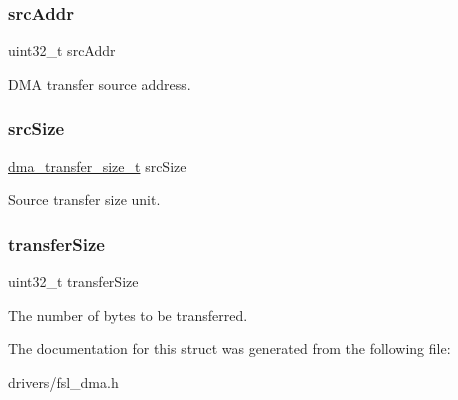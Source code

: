 \subsubsection{\texorpdfstring{srcAddr}{srcAddr}}
{\footnotesize\ttfamily uint32\+\_\+t src\+Addr}

D\+MA transfer source address. \mbox{\label{struct__dma__transfer__config_a60bfcc72290b71d1cdda387f1a7c2dac}} 
\subsubsection{\texorpdfstring{srcSize}{srcSize}}
{\footnotesize\ttfamily \mbox{\hyperlink{group__dma_ga77280b3fae0e8ee447666e14c101dfe0}{dma\+\_\+transfer\+\_\+size\+\_\+t}} src\+Size}

Source transfer size unit. \mbox{\label{struct__dma__transfer__config_a6feb07da81f2cb170eabc3d00565d404}} 
\subsubsection{\texorpdfstring{transferSize}{transferSize}}
{\footnotesize\ttfamily uint32\+\_\+t transfer\+Size}

The number of bytes to be transferred. 

The documentation for this struct was generated from the following file\+:\begin{DoxyCompactItemize}
\item 
drivers/fsl\+\_\+dma.\+h\end{DoxyCompactItemize}
